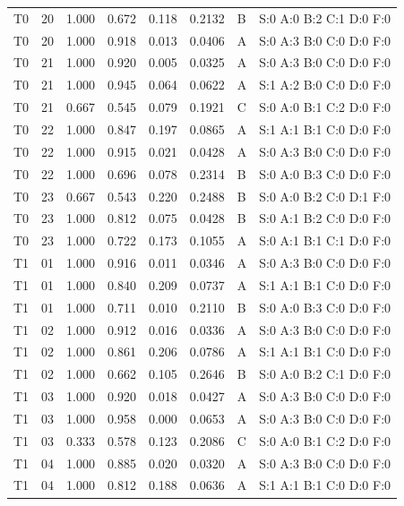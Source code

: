 \begin{longtable}{lrrrrrll}
T0 & 20 & 1.000 & 0.672 & 0.118 & 0.2132 & B & \tiny S:0 A:0 B:2 C:1 D:0 F:0 \\
T0 & 20 & 1.000 & 0.918 & 0.013 & 0.0406 & A & \tiny S:0 A:3 B:0 C:0 D:0 F:0 \\
T0 & 21 & 1.000 & 0.920 & 0.005 & 0.0325 & A & \tiny S:0 A:3 B:0 C:0 D:0 F:0 \\
T0 & 21 & 1.000 & 0.945 & 0.064 & 0.0622 & A & \tiny S:1 A:2 B:0 C:0 D:0 F:0 \\
T0 & 21 & 0.667 & 0.545 & 0.079 & 0.1921 & C & \tiny S:0 A:0 B:1 C:2 D:0 F:0 \\
T0 & 22 & 1.000 & 0.847 & 0.197 & 0.0865 & A & \tiny S:1 A:1 B:1 C:0 D:0 F:0 \\
T0 & 22 & 1.000 & 0.915 & 0.021 & 0.0428 & A & \tiny S:0 A:3 B:0 C:0 D:0 F:0 \\
T0 & 22 & 1.000 & 0.696 & 0.078 & 0.2314 & B & \tiny S:0 A:0 B:3 C:0 D:0 F:0 \\
T0 & 23 & 0.667 & 0.543 & 0.220 & 0.2488 & B & \tiny S:0 A:0 B:2 C:0 D:1 F:0 \\
T0 & 23 & 1.000 & 0.812 & 0.075 & 0.0428 & B & \tiny S:0 A:1 B:2 C:0 D:0 F:0 \\
T0 & 23 & 1.000 & 0.722 & 0.173 & 0.1055 & A & \tiny S:0 A:1 B:1 C:1 D:0 F:0 \\
T1 & 01 & 1.000 & 0.916 & 0.011 & 0.0346 & A & \tiny S:0 A:3 B:0 C:0 D:0 F:0 \\
T1 & 01 & 1.000 & 0.840 & 0.209 & 0.0737 & A & \tiny S:1 A:1 B:1 C:0 D:0 F:0 \\
T1 & 01 & 1.000 & 0.711 & 0.010 & 0.2110 & B & \tiny S:0 A:0 B:3 C:0 D:0 F:0 \\
T1 & 02 & 1.000 & 0.912 & 0.016 & 0.0336 & A & \tiny S:0 A:3 B:0 C:0 D:0 F:0 \\
T1 & 02 & 1.000 & 0.861 & 0.206 & 0.0786 & A & \tiny S:1 A:1 B:1 C:0 D:0 F:0 \\
T1 & 02 & 1.000 & 0.662 & 0.105 & 0.2646 & B & \tiny S:0 A:0 B:2 C:1 D:0 F:0 \\
T1 & 03 & 1.000 & 0.920 & 0.018 & 0.0427 & A & \tiny S:0 A:3 B:0 C:0 D:0 F:0 \\
T1 & 03 & 1.000 & 0.958 & 0.000 & 0.0653 & A & \tiny S:0 A:3 B:0 C:0 D:0 F:0 \\
T1 & 03 & 0.333 & 0.578 & 0.123 & 0.2086 & C & \tiny S:0 A:0 B:1 C:2 D:0 F:0 \\
T1 & 04 & 1.000 & 0.885 & 0.020 & 0.0320 & A & \tiny S:0 A:3 B:0 C:0 D:0 F:0 \\
T1 & 04 & 1.000 & 0.812 & 0.188 & 0.0636 & A & \tiny S:1 A:1 B:1 C:0 D:0 F:0 \\

\end{longtable}

